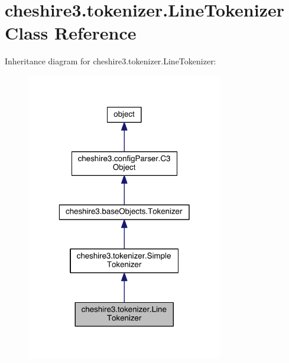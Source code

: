 \hypertarget{classcheshire3_1_1tokenizer_1_1_line_tokenizer}{\section{cheshire3.\-tokenizer.\-Line\-Tokenizer Class Reference}
\label{classcheshire3_1_1tokenizer_1_1_line_tokenizer}
}


Inheritance diagram for cheshire3.\-tokenizer.\-Line\-Tokenizer\-:
\nopagebreak
\begin{figure}[H]
\begin{center}
\leavevmode
\includegraphics[width=244pt]{classcheshire3_1_1tokenizer_1_1_line_tokenizer__inherit__graph}
\end{center}
\end{figure}


